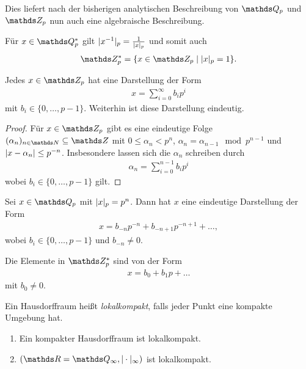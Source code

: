 Dies liefert nach der bisherigen analytischen Beschreibung von $\Q_p$ und $\Z_p$ nun auch eine algebraische Beschreibung.

Für $x\in \Q_p^\ast$ gilt $|x^{-1}|_p=\frac{1}{|x|_p}$ und somit auch
\begin{align*}
\Z_p^\ast=\{x\in \Z_p \mid \abs{x}_p=1\}.
\end{align*}



\begin{prop}
Jedes $x\in \Z_p$ hat eine Darstellung der Form
\begin{align*}
x=\sum_{i=0}^\infty b_i p^i
\end{align*}
mit $b_i \in \{0,\dots,p-1\}$. Weiterhin ist diese Darstellung eindeutig.
\end{prop}
\begin{proof}
Für $x \in \Z_p$ gibt es eine eindeutige Folge $(\alpha_n)_{n\in \N}\subseteq \Z$ mit $0 \leq \alpha_n<p^n$, $\alpha_n=\alpha_{n-1} \mod p^{n-1}$ und $|x-\alpha_n|\leq p^{-n}$.
Insbesondere lassen sich die $\alpha_n$ schreiben durch
\begin{align*}
\alpha_n=\sum_{i=0}^{n-1} b_i p^i
\end{align*}
wobei $b_i \in\{0,\dots,p-1\}$ gilt.
\end{proof}

\begin{prop}
Sei $x\in \Q_p$ mit $|x|_p=p^n$. Dann hat $x$ eine eindeutige Darstellung der Form
\begin{align*}
x=b_{-n}p^{-n}+b_{-n+1}p^{-n+1}+\dots,
\end{align*}
wobei $b_i \in \{0,\dots,p-1\}$ und $b_{-n}\not =0$.
\end{prop}

\begin{bem}
Die Elemente in $\Z_p^\ast$ sind von der Form
\begin{align*}
x=b_0+b_1p+\dots
\end{align*}
mit $b_0\not =0$.
\end{bem}

\begin{defi}
Ein Hausdorffraum heißt \emph{lokalkompakt}, falls jeder Punkt eine kompakte Umgebung hat.
\end{defi}

\begin{bsp}
\begin{enumerate}[label=(\roman*)]
\item Ein kompakter Hausdorffraum ist lokalkompakt.
\item $(\R=\Q_\infty,\abs{\cdot}_\infty)$ ist lokalkompakt.
\end{enumerate}
\end{bsp}

